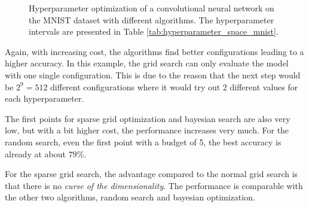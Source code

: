 \begin{figure}[htbp!]
	\centering
	\caption{ Hyperparameter optimization of a convolutional neural network on the MNIST dataset with different algorithms. The hyperparameter intervals are presented in Table \ref{tab:hyperparameter_space_mnist}. }	
	\label{fig:MNIST_results}
\end{figure}

Again, with increasing cost, the algorithms find better configurations leading to a higher accuracy. In this example, the grid search can only evaluate the model with one single configuration. This is due to the reason that the next step would be $ 2^9 = 512 $ different configurations where it would try out 2 different values for each hyperparameter. \newline 

The first points for sparse grid optimization and bayesian search are also very low, but with a bit higher cost, the performance increases very much. For the random search, even the first point with a budget of 5, the best accuracy is already at about $ 79\% $. \newline 

For the sparse grid search, the advantage compared to the normal grid search is that there is no \textit{curse of the dimensionality}. The performance is comparable with the other two algorithms, random search and bayesian optimization. \newline 

